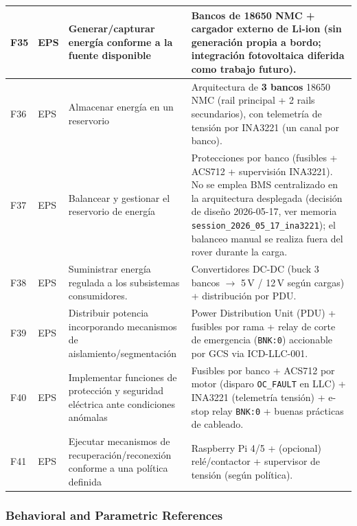 \begin{landscape}
\begin{longtable}{|p{0.9cm}|p{2.0cm}|p{6.8cm}|p{9.2cm}|}
F35 & EPS & Generar/capturar energía conforme a la fuente disponible &
Bancos de 18650 NMC + cargador externo de Li-ion (sin generación propia a bordo; integración fotovoltaica diferida como trabajo futuro).\\ \hline

F36 & EPS & Almacenar energía en un reservorio &
Arquitectura de \textbf{3 bancos} 18650 NMC (rail principal + 2 rails secundarios), con telemetría de tensión por INA3221 (un canal por banco).\\ \hline

F37 & EPS & Balancear y gestionar el reservorio de energía &
Protecciones por banco (fusibles + ACS712 + supervisión INA3221). No se emplea BMS centralizado en la arquitectura desplegada (decisión de diseño 2026-05-17, ver memoria \texttt{session\_2026\_05\_17\_ina3221}); el balanceo manual se realiza fuera del rover durante la carga.\\ \hline

F38 & EPS & Suministrar energía regulada a los subsistemas consumidores. &
Convertidores DC-DC (buck 3 bancos $\rightarrow$ 5\,V / 12\,V según cargas) + distribución por PDU.\\ \hline

F39 & EPS & Distribuir potencia incorporando mecanismos de aislamiento/segmentación &
Power Distribution Unit (PDU) + fusibles por rama + relay de corte de emergencia (\texttt{BNK:0}) accionable por GCS via ICD-LLC-001.\\ \hline

F40 & EPS & Implementar funciones de protección y seguridad eléctrica ante condiciones anómalas &
Fusibles por banco + ACS712 por motor (disparo \texttt{OC\_FAULT} en LLC) + INA3221 (telemetría tensión) + e-stop relay \texttt{BNK:0} + buenas prácticas de cableado.\\ \hline

F41 & EPS & Ejecutar mecanismos de recuperación/reconexión conforme a una política definida &
Raspberry Pi 4/5 + (opcional) relé/contactor + supervisor de tensión (según política).\\ \hline

\end{longtable}
\end{landscape}
\subsubsection{Behavioral and Parametric References}


